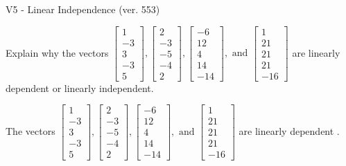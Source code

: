 \begin{exercise}
  \begin{exerciseTitle}V5 - Linear Independence (ver. 553)\end{exerciseTitle}
  \begin{exerciseStatement}
    Explain why the vectors \(\left[\begin{array}{r}
1 \\
-3 \\
3 \\
-3 \\
5
\end{array}\right] , \left[\begin{array}{r}
2 \\
-3 \\
-5 \\
-4 \\
2
\end{array}\right] , \left[\begin{array}{r}
-6 \\
12 \\
4 \\
14 \\
-14
\end{array}\right] , \text{ and } \left[\begin{array}{r}
1 \\
21 \\
21 \\
21 \\
-16
\end{array}\right]\) are linearly dependent or linearly independent.	


  \end{exerciseStatement}
  \begin{exerciseAnswer}
   The vectors \(\left[\begin{array}{r}
1 \\
-3 \\
3 \\
-3 \\
5
\end{array}\right] , \left[\begin{array}{r}
2 \\
-3 \\
-5 \\
-4 \\
2
\end{array}\right] , \left[\begin{array}{r}
-6 \\
12 \\
4 \\
14 \\
-14
\end{array}\right] , \text{ and } \left[\begin{array}{r}
1 \\
21 \\
21 \\
21 \\
-16
\end{array}\right]\) are 
  	 linearly dependent  .
  


  \end{exerciseAnswer}
\end{exercise}